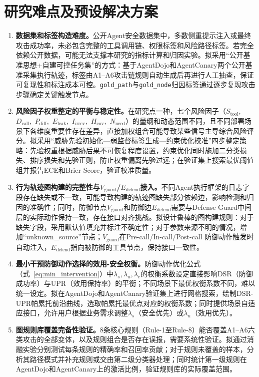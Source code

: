 \section{研究难点及预设解决方案}

\begin{enumerate}
  \item \textbf{数据集和标签构造难度。}公开Agent安全数据集中，多数侧重提示注入或最终攻击成功率，未必包含完整的工具调用链、权限标签和风险路径标签。若完全依赖公开数据，可能无法支撑本研究的指标计算和归因实验。拟采用“公开基准思想+自建可控任务集”的方式：基于AgentDojo\cite{balunovic2024agentdojo}和AgentCanary\cite{li2026agentcanary}两个公开基准采集执行轨迹，标签由A1--A6攻击链规则自动生成后再进行人工抽查，保证可复现性和标注成本可控。\texttt{gold\_path}与\texttt{gold\_node}归因标签通过逐步复现攻击步骤确定关键触发节点。

  \item \textbf{风险因子权重整定的平衡与稳定性。}在研究点一种，七个风险因子（$S_{\text{tool}},$ $D_{\text{call}},$ $P_{\text{diff}},$ $E_{\text{leak}},$ $I_{\text{irrev}},$ $H_{\text{cov}},$ $N_{\text{need}}$）的量纲和动态范围不同，且不同部署场景下各维度重要性存在差异，直接加权组合可能导致某些信号主导综合风险评分。拟采用“威胁先验初始化—弱监督标签生成—约束优化校准”四步整定策略：先验权重根据威胁后果不可恢复程度设置，约束优化同时施加二分类损失、排序损失和先验正则，防止权重偏离先验过远；在验证集上搜索最优阈值组并报告ECE和Brier Score，验证校准质量。

  \item \textbf{行为轨迹图构建的完整性与$V_{\text{guard}}$/$E_{\text{defend}}$接入。}不同Agent执行框架的日志字段存在缺失或不一致，可能导致构建的轨迹图缺失部分依赖边，影响检测和归因的准确性；同时，防御节点$V_{\text{guard}}$和防御边$E_{\text{defend}}$需要与Defense Guard中间层的实际动作保持一致，存在接口对齐挑战。拟设计鲁棒的图构建规则：对于缺失字段，采用默认值填充并标注不确定性；对于参数来源不明的情况，增加“unknown\_source”节点；$V_{\text{guard}}$在Pre-call/In-call/Post-call 防御动作触发时自动注入，$E_{\text{defend}}$指向被防御的工具节点，保持接口一致性。

  \item \textbf{最小干预防御动作选择的效用-安全权衡。}防御动作优化公式（式~\ref{eq:min_intervention}）中$\lambda_s, \lambda_u, \lambda_c$的权衡系数设定直接影响DSR（防御成功率）与UPR（效用保持率）的平衡；不同场景下最优权衡系数不同，难以统一设定。拟在AgentDojo和AgentCanary验证集上进行网格搜索，绘制DSR-UPR帕累托前沿曲线，选取帕累托最优点对应的权衡系数；同时提供场景自适应接口，允许用户根据业务需求调整$\lambda_s$（安全优先）或$\lambda_u$（效用优先）。

  \item \textbf{图规则库覆盖完备性验证。}8条核心规则（Rule-1至Rule-8）能否覆盖A1--A6六类攻击的全部变体，以及规则组合是否存在误报，需要系统性验证。拟通过消融实验分别测试每条规则的精确率和召回率贡献；对于规则未覆盖的样本，分析其路径模式并补充规则或交由第二级分类器处理；同时统计第一级规则在AgentDojo和AgentCanary上的激活比例，验证规则库的实际覆盖范围。
\end{enumerate}
